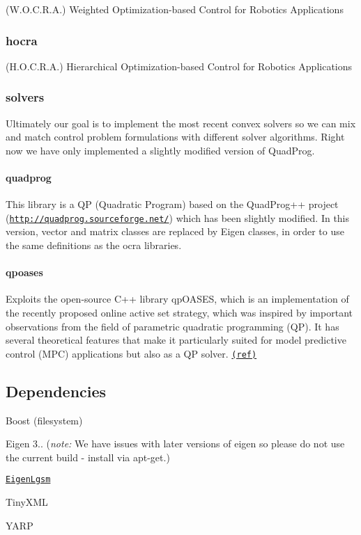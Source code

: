 (W.\+O.\+C.\+R.\+A.) Weighted Optimization-\/based Control for Robotics Applications

\subsubsection*{hocra}

(H.\+O.\+C.\+R.\+A.) Hierarchical Optimization-\/based Control for Robotics Applications

\subsubsection*{solvers}

Ultimately our goal is to implement the most recent convex solvers so we can mix and match control problem formulations with different solver algorithms. Right now we have only implemented a slightly modified version of Quad\+Prog.

\paragraph*{quadprog}

This library is a QP (Quadratic Program) based on the Quad\+Prog++ project (\href{http://quadprog.sourceforge.net/}{\tt http\+://quadprog.\+sourceforge.\+net/}) which has been slightly modified. In this version, vector and matrix classes are replaced by Eigen classes, in order to use the same definitions as the ocra libraries.

\paragraph*{qpoases}

Exploits the open-\/source C++ library qp\+O\+A\+S\+ES, which is an implementation of the recently proposed online active set strategy, which was inspired by important observations from the field of parametric quadratic programming (QP). It has several theoretical features that make it particularly suited for model predictive control (M\+PC) applications but also as a QP solver. \href{https://projects.coin-or.org/qpOASES}{\tt (ref)}

\subsection*{Dependencies}


\begin{DoxyItemize}
\item Boost ({\ttfamily filesystem})
\item Eigen 3.. ({\itshape note\+:} We have issues with later versions of eigen so please do not use the current build -\/ install via apt-\/get.)
\item \href{https://github.com/ocra-recipes/eigen_lgsm}{\tt Eigen\+Lgsm}
\item Tiny\+X\+ML
\item Y\+A\+RP
\end{DoxyItemize}

